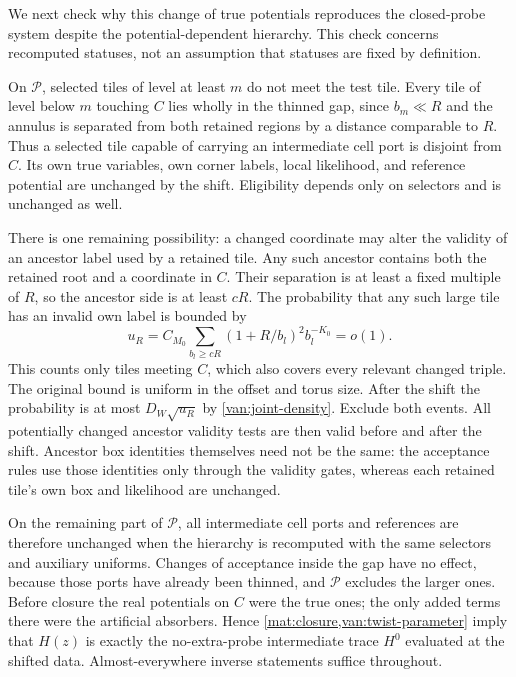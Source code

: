 We next check why this change of true potentials reproduces the
closed-probe system despite the potential-dependent hierarchy.
This check concerns recomputed statuses, not an assumption that
statuses are fixed by definition.

On $\mathcal P$, selected tiles of level at least $m$ do not meet
the test tile. Every tile of level below $m$ touching $C$ lies wholly
in the thinned gap, since $b_m\ll R$ and the annulus is separated
from both retained regions by a distance comparable to $R$. Thus a
selected tile capable of carrying an intermediate cell port is
disjoint from $C$. Its own true variables, own corner labels, local
likelihood, and reference potential are unchanged by the shift.
Eligibility depends only on selectors and is unchanged as well.

There is one remaining possibility: a changed coordinate may alter
the validity of an ancestor label used by a retained tile. Any such
ancestor contains both the retained root and a coordinate in $C$.
Their separation is at least a fixed multiple of $R$, so the ancestor
side is at least $cR$. The probability that any such large tile has
an invalid own label is bounded by
\begin{equation}\label{van:gate-exception}
 u_R=C_{M_0}\sum_{b_l\geq cR}(1+R/b_l)^2b_l^{-K_0}=o(1).
\end{equation}
This counts only tiles meeting $C$, which also covers every relevant
changed triple. The original bound is uniform in the offset and
torus size. After the shift the probability is at most
$D_W\sqrt{u_R}$ by \cref{van:joint-density}. Exclude both events.
All potentially changed ancestor validity tests are then valid before
and after the shift. Ancestor box identities themselves need not be
the same: the acceptance rules use those identities only through the
validity gates, whereas each retained tile's own box and likelihood
are unchanged.

On the remaining part of $\mathcal P$, all intermediate cell ports
and references are therefore unchanged when the hierarchy is
recomputed with the same selectors and auxiliary uniforms. Changes
of acceptance inside the gap have no effect, because those ports
have already been thinned, and $\mathcal P$ excludes the larger
ones. Before closure the real potentials on $C$ were the true ones;
the only added terms there were the artificial absorbers. Hence
\cref{mat:closure,van:twist-parameter} imply that $H(z)$ is exactly
the no-extra-probe intermediate trace $H^0$ evaluated at the shifted
data. Almost-everywhere inverse statements suffice throughout.

